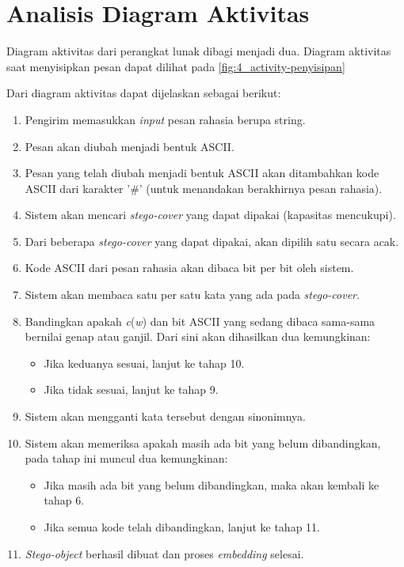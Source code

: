 \section{Analisis Diagram Aktivitas}

Diagram aktivitas dari perangkat lunak dibagi menjadi dua. Diagram aktivitas saat menyisipkan pesan dapat dilihat pada \ref{fig:4_activity-penyisipan}

Dari diagram aktivitas dapat dijelaskan sebagai berikut:

\begin{enumerate}
	\item Pengirim memasukkan \textit{input} pesan rahasia berupa string.
	\item Pesan akan diubah menjadi bentuk ASCII.
	\item Pesan yang telah diubah menjadi bentuk ASCII akan ditambahkan kode ASCII dari karakter '\#' (untuk menandakan berakhirnya pesan rahasia).
	\item Sistem akan mencari \textit{stego-cover} yang dapat dipakai (kapasitas mencukupi).
	\item Dari beberapa \textit{stego-cover} yang dapat dipakai, akan dipilih satu secara acak.
	\item Kode ASCII dari pesan rahasia akan dibaca bit per bit oleh sistem.
	\item Sistem akan membaca satu per satu kata yang ada pada \textit{stego-cover}.
	\item Bandingkan apakah \textit{c}(\textit{w}) dan bit ASCII yang sedang dibaca sama-sama bernilai genap atau ganjil. Dari sini akan dihasilkan dua kemungkinan:
		\begin{itemize}
			\item Jika keduanya sesuai, lanjut ke tahap 10.
			\item Jika tidak sesuai, lanjut ke tahap 9.
		\end{itemize}
	\item Sistem akan mengganti kata tersebut dengan sinonimnya.
	\item Sistem akan memeriksa apakah masih ada bit yang belum dibandingkan, pada tahap ini muncul dua kemungkinan:
		\begin{itemize}
			\item Jika masih ada bit yang belum dibandingkan, maka akan kembali ke tahap 6.
			\item Jika semua kode telah dibandingkan, lanjut ke tahap 11.
		\end{itemize}
	\item \textit{Stego-object} berhasil dibuat dan proses \textit{embedding} selesai.
\end{enumerate}

